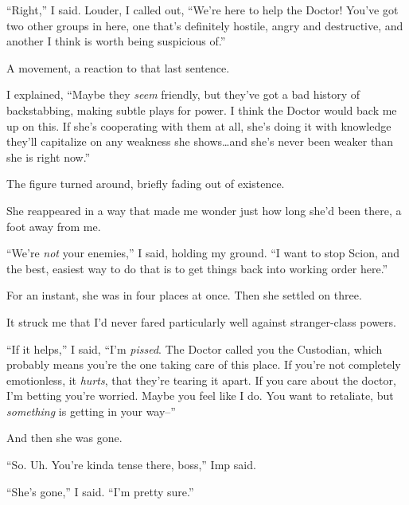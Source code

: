 ``Right,'' I said.  Louder, I called out, ``We're here to help the Doctor!  You've got two other groups in here, one that's definitely hostile, angry and destructive, and another I think is worth being suspicious of.''



A movement, a reaction to that last sentence.



I explained, ``Maybe they \emph{seem} friendly, but they've got a bad history of backstabbing, making subtle plays for power.  I think the Doctor would back me up on this.  If she's cooperating with them at all, she's doing it with knowledge they'll capitalize on any weakness she shows\ldots and she's never been weaker than she is right now.''



The figure turned around, briefly fading out of existence.



She reappeared in a way that made me wonder just how long she'd been there, a foot away from me.



``We're \emph{not} your enemies,'' I said, holding my ground.  ``I want to stop Scion, and the best, easiest way to do that is to get things back into working order here.''



For an instant, she was in four places at once.  Then she settled on three.



It struck me that I'd never fared particularly well against stranger-class powers.



``If it helps,'' I said, ``I'm \emph{pissed}.  The Doctor called you the Custodian, which probably means you're the one taking care of this place.  If you're not completely emotionless, it \emph{hurts}, that they're tearing it apart.  If you care about the doctor, I'm betting you're worried.  Maybe you feel like I do.  You want to retaliate, but \emph{something} is getting in your way--''



And then she was gone.



``So.  Uh.  You're kinda tense there, boss,'' Imp said.



``She's gone,'' I said.  ``I'm pretty sure.''



